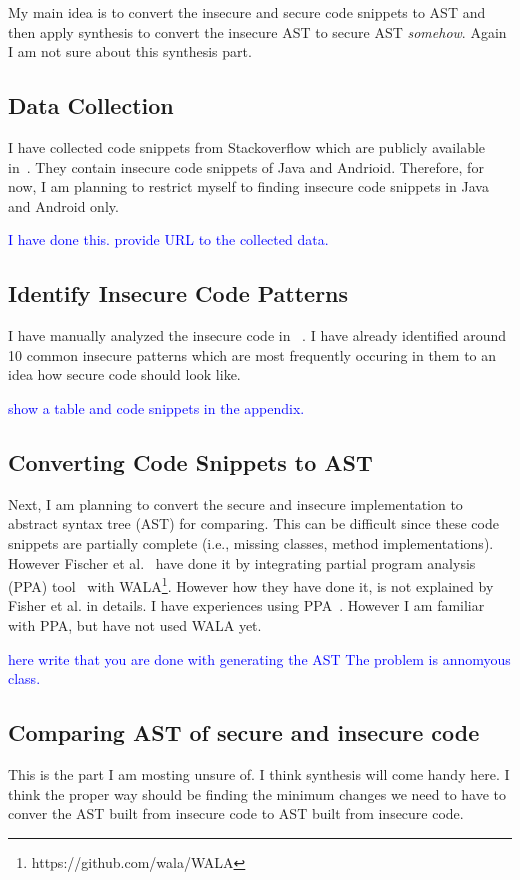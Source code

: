 \documentclass[sigconf]{acmart}
\begin{document}
My main idea is to convert the insecure and secure code snippets to AST and then apply synthesis to convert the insecure AST to secure AST \textit{somehow}. Again I am not sure about this synthesis part.  

\subsection{Data Collection}
I have collected code snippets from Stackoverflow which are publicly available in~\cite{fischer2017stack, meng2018secure}. They contain insecure code snippets of Java and Andrioid. Therefore, for now, I am planning to restrict myself to finding insecure code snippets in Java and Android only. 

\textcolor{blue}{
  I have done this. provide URL to the collected data.
}


\subsection{Identify Insecure Code Patterns}
I have manually analyzed the insecure code in ~\cite{fischer2017stack,meng2018secure}. I have already identified around 10 common insecure patterns which are most frequently occuring in them to an idea how secure code should look like.

\textcolor{blue}{
  show a table and code snippets in the appendix.
}
\subsection{Converting Code Snippets to AST}
Next, I am planning to convert the secure and insecure implementation to abstract syntax tree (AST) for comparing. This can be difficult since these code snippets are partially complete (i.e., missing classes, method implementations). However Fischer et al.~\cite{fischer2017stack} have done it by integrating partial program analysis (PPA) tool~\cite{dagenais2008enabling} with WALA\footnote{https://github.com/wala/WALA}. However how they have done it, is not explained by Fisher et al. in details. I have experiences using PPA~\cite{dagenais2008enabling}. However I am familiar with PPA, but have not used WALA yet. %

\textcolor{blue}{
 here write that you are done with generating the AST
 The problem is annomyous class.
}

\subsection{Comparing AST of secure and insecure code}
This is the part I am mosting unsure of. I think synthesis will come handy here. 
I think the proper way should be finding the minimum changes we need to have to conver the AST built from insecure code to AST built from insecure code.  
\end{document}

